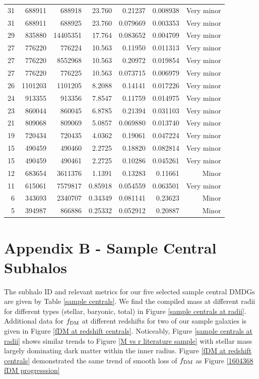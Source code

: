 \documentclass[twocolumn]{openjournal}
\begin{document}
\begin{table}[ht]
\begin{tabular}{rrrrrrr}
31 & 688911 & 688918 & 23.760 & 0.21237 & 0.008938 & Very minor \\
31 & 688911 & 688925 & 23.760 & 0.079669 & 0.003353 & Very minor \\
29 & 835880 & 14405351 & 17.764 & 0.083652 & 0.004709 & Very minor \\
27 & 776220 & 776224 & 10.563 & 0.11950 & 0.011313 & Very minor \\
27 & 776220 & 8552968 & 10.563 & 0.20972 & 0.019854 & Very minor \\
27 & 776220 & 776225 & 10.563 & 0.073715 & 0.006979 & Very minor \\
26 & 1101203 & 1101205 & 8.2088 & 0.14141 & 0.017226 & Very minor \\
24 & 913355 & 913356 & 7.8547 & 0.11759 & 0.014975 & Very minor \\
23 & 860044 & 860045 & 6.8785 & 0.21394 & 0.031103 & Very minor \\
21 & 809068 & 809069 & 5.0857 & 0.069880 & 0.013740 & Very minor \\
19 & 720434 & 720435 & 4.0362 & 0.19061 & 0.047224 & Very minor \\
15 & 490459 & 490460 & 2.2725 & 0.18820 & 0.082814 & Very minor \\
15 & 490459 & 490461 & 2.2725 & 0.10286 & 0.045261 & Very minor \\
12 & 683654 & 3611376 & 1.1391 & 0.13283 & 0.11661 & Minor \\
11 & 615061 & 7579817 & 0.85918 & 0.054559 & 0.063501 & Very minor \\
6 & 343693 & 2340707 & 0.34349 & 0.081141 & 0.23623 & Minor \\
5 & 394987 & 866886 & 0.25332 & 0.052912 & 0.20887 & Minor \\

\hline
\end{tabular}
\end{table}

\section{Appendix B - Sample Central Subhalos} \label{app: Sample Central Subhalos}
The subhalo ID and relevant metrics for our five selected sample central DMDGs are given by Table \ref{sample centrals}. We find the compiled mass at different radii for different types (stellar, baryonic, total) in Figure \ref{sample centrals at radii}. Additional data for $f_\textup{DM}$ at different redshifts for two of our sample galaxies is given in Figure \ref{fDM at redshift centrals}. Noticeably, Figure \ref{sample centrals at radii} shows similar trends to Figure \ref{M vs r literature sample} with stellar mass largely dominating dark matter within the inner radius. Figure \ref{fDM at redshift centrals} demonstrated the same trend of smooth loss of $f_\textup{DM}$ as Figure \ref{1604368 fDM progresssion}
\end{document}
